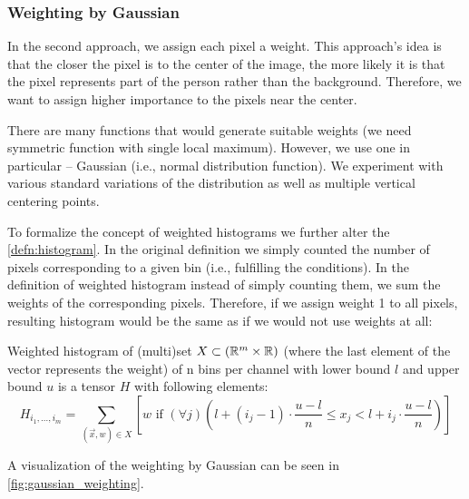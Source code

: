 \subsubsection{Weighting by Gaussian}

In the second approach, we assign each pixel a weight. This approach's idea is that the closer the pixel is to the center of the image, the more likely it is that the pixel represents part of the person rather than the background. Therefore, we want to assign higher importance to the pixels near the center.

There are many functions that would generate suitable weights (we need symmetric
function with single local maximum). However, we use one in particular
-- Gaussian (i.e., normal distribution function). We experiment with various
standard variations of the distribution as well as multiple vertical centering points.


To formalize the concept of weighted histograms we further alter the \autoref{defn:histogram}. In the original definition we simply counted the number of pixels corresponding to a given bin (i.e., fulfilling the conditions). In the definition of weighted histogram instead of simply counting them, we sum the weights of the corresponding pixels. Therefore, if we assign weight 1 to all pixels, resulting histogram would be the same as if we would not use weights at all:

\begin{defn}
\label{defn:weighted_histogram}
Weighted histogram of (multi)set $X \subset (\mathbb{R}^m \times \mathbb{R})$ (where the last
element of the vector represents the weight) of n bins per channel with
lower bound $l$ and upper bound $u$ is a tensor $H$ with following elements:
$$H_{i_1, \ldots, i_m} = \sum_{(\vec{x}, w) \in X} \left[w \text{ if } (\forall j) \left(l + (i_j-1) \cdot \frac{u-l}{n} \leq x_j < l + i_j \cdot \frac{u-l}{n}\right)\right]$$
\end{defn}

A visualization of the weighting by Gaussian can be seen in \autoref{fig:gaussian_weighting}.

